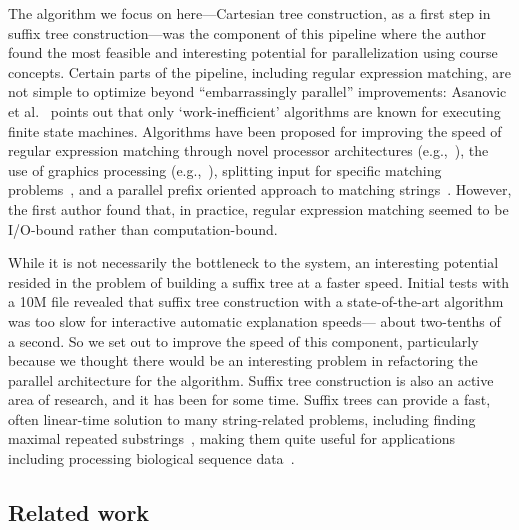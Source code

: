 \documentclass[10pt]{article}
\begin{document}
The algorithm we focus on here---Cartesian tree construction, as a first step in suffix tree
construction---was the component of this pipeline where the author found
the most feasible and interesting potential for parallelization using course concepts.
Certain parts of the pipeline, including regular expression matching, are not simple to optimize
beyond ``embarrassingly parallel'' improvements:
Asanovic et al.~\cite{asanovic_view_2009} points out that only `work-inefficient' algorithms are
known for executing finite state machines.
Algorithms have been proposed for improving the speed of regular expression matching through
novel processor architectures (e.g.,~\cite{brodie_scalable_2006}), the use of graphics processing
(e.g.,~\cite{vasiliadis_regular_2009}), splitting input for specific matching
problems~\cite{jones_parallelizing_2009}, and a parallel prefix oriented approach to matching
strings~\cite{hillis_data_1986}.
However, the first author found that, in practice, regular expression matching seemed to be
I/O-bound rather than computation-bound.

While it is not necessarily the bottleneck to the system, an interesting potential resided in
the problem of building a suffix tree at a faster speed.
Initial tests with a 10M file revealed that suffix tree construction with a state-of-the-art
algorithm~\cite{shun_simple_2014} was too slow for interactive automatic explanation speeds---
about two-tenths of a second.
So we set out to improve the speed of this component, particularly because we thought there would
be an interesting problem in refactoring the parallel architecture for the algorithm.
Suffix tree construction is also an active area of research, and it has been for some time.
Suffix trees can provide a fast, often linear-time solution to many string-related problems, 
including finding maximal repeated substrings~\cite{gusfield_algorithms_1997}, making them quite
useful for applications including processing biological sequence
data~\cite{bieganski_generalized_1994}.

\subsection{Related work}
\end{document}
